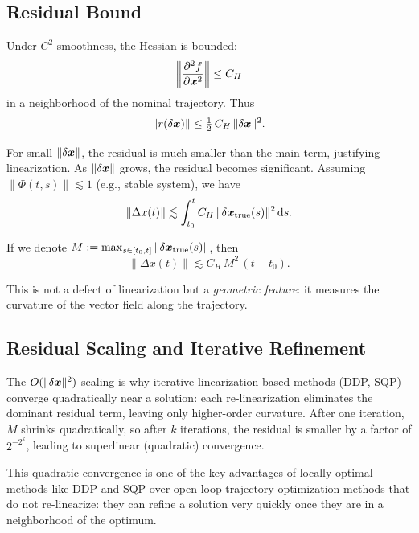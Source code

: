 \subsection{Residual Bound}

Under $C^2$ smoothness, the Hessian is bounded:
\begin{equation}
\left\|\frac{\partial^2 f}{\partial\bm{x}^2}\right\| \leq C_H
\end{equation}
in a neighborhood of the nominal trajectory. Thus
\begin{equation}
\|r(\delta\bm{x})\| \leq \tfrac{1}{2}\,C_H\,\|\delta\bm{x}\|^2.
\label{eq:ch2:residual-hessian}
\end{equation}

For small $\|\delta\bm{x}\|$, the residual is much smaller than the main term, justifying linearization. As $\|\delta\bm{x}\|$ grows,
the residual becomes significant. Assuming $\|\Phi(t,s)\| \lesssim 1$ (e.g., stable system), we have
\begin{equation}
\|\Delta x(t)\| \lesssim \int_{t_0}^{t}C_H\,\|\delta\bm{x}_{\text{true}}(s)\|^2\,\mathrm{d} s.
\label{eq:ch2:residual-growth}
\end{equation}

If we denote $M := \max_{s\in[t_0,t]}\|\delta\bm{x}_{\text{true}}(s)\|$, then
\begin{equation}
\|\Delta x(t)\| \lesssim C_H\,M^2\,(t-t_0).
\label{eq:ch2:residual-final}
\end{equation}

This is not a defect of linearization but a \emph{geometric feature}: it measures the curvature of the vector field
along the trajectory.

\subsection{Residual Scaling and Iterative Refinement}

The $O(\|\delta\bm{x}\|^2)$ scaling is why iterative linearization-based methods (DDP, SQP) converge quadratically near a
solution: each re-linearization eliminates the dominant residual term, leaving only higher-order curvature. After
one iteration, $M$ shrinks quadratically, so after $k$ iterations, the residual is smaller by a factor of $2^{-2^k}$,
leading to superlinear (quadratic) convergence.

\begin{remark}
This quadratic convergence is one of the key advantages of locally optimal methods like DDP and SQP over
open-loop trajectory optimization methods that do not re-linearize: they can refine a solution very quickly
once they are in a neighborhood of the optimum.
\end{remark}


